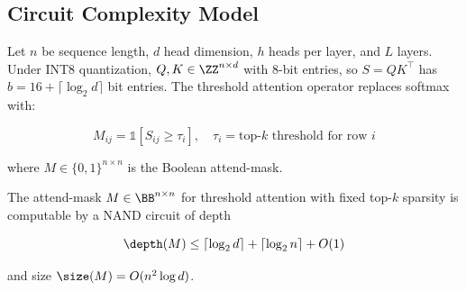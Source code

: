 \subsection{Circuit Complexity Model}











Let $n$ be sequence length, $d$ head dimension, $h$ heads per layer, and $L$ layers. Under INT8 quantization, $Q, K \in \ZZ^{n \times d}$ with $8$-bit entries, so $S = QK^\top$ has $b = 16 + \lceil \log_2 d \rceil$ bit entries. The threshold attention operator replaces softmax with:





\[





M_{ij} = \mathbb{1}[S_{ij} \ge \tau_i], \quad \tau_i = \text{top-}k\text{ threshold for row } i





\]





where $M \in \{0,1\}^{n \times n}$ is the Boolean attend-mask.











\begin{theorem}





\label{thm:nand-depth-hw}





The attend-mask $M \in \BB^{n \times n}$ for threshold attention with fixed top-$k$ sparsity is computable by a NAND circuit of depth





\[





\depth(M) \le \lceil \log_2 d \rceil + \lceil \log_2 n \rceil + O(1)





\]





and size $\size(M) = O(n^2 \log d)$.





\end{theorem}











